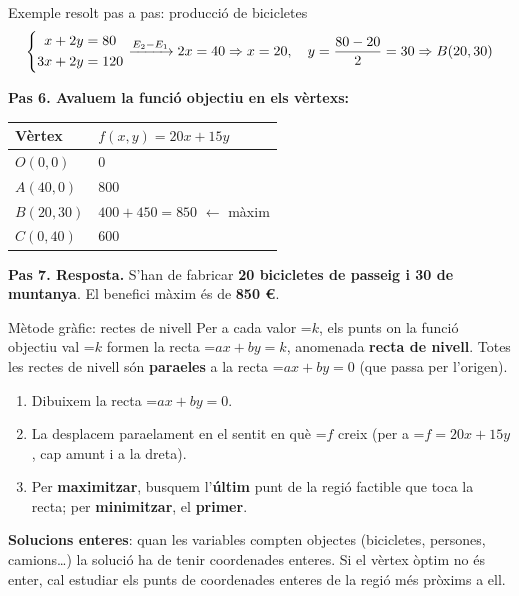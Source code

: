 \documentclass[11pt,a4paper]{article}
\newcommand{\fmm}[1]{\setbox0=\hbox{$#1$}\ifdim\wd0>\linewidth\fmdisp{#1}\else\mbox{\box0}\fi}
\newcommand{\fmdisp}[1]{\[\setbox2=\hbox{$\displaystyle #1$}\ifdim\wd2>\linewidth\resizebox{\linewidth}{!}{\box2}\else\box2\fi\]}
\newcommand{\fmuline}[1]{\textbf{\color{fmaccent}#1}}
\begin{document}
\begin{fmex}{Exemple resolt pas a pas: producció de bicicletes}
\fmdisp{\left\{\begin{aligned}x+2y&=80\\ 3x+2y&=120\end{aligned}\right.\xrightarrow{E_2-E_1}2x=40\Rightarrow x=20,\quad y=\frac{80-20}{2}=30\Rightarrow B(20,30)}

\textbf{Pas 6. Avaluem la funció objectiu en els vèrtexs:}

\begin{center}\renewcommand{\arraystretch}{1.5}\small\begin{tabularx}{\linewidth}{>{\raggedright\arraybackslash}p{3.2cm}>{\raggedright\arraybackslash}X}\toprule
\textbf{Vèrtex} & \textbf{$f(x,y)=20x+15y$}\\\midrule
$O(0,0)$ & $0$\\[3pt]
$A(40,0)$ & $800$\\[3pt]
\cellcolor{fmyellow!45}$B(20,30)$ & \cellcolor{fmyellow!45}$400+450=850$ $\leftarrow$ màxim\\[3pt]
$C(0,40)$ & $600$\\[3pt]
\bottomrule\end{tabularx}\end{center}

\textbf{Pas 7. Resposta.} S'han de fabricar \textbf{20 bicicletes de passeig i 30 de muntanya}. El benefici màxim és de \textbf{850 €}.
\end{fmex}

\begin{fmdef}{Mètode gràfic: rectes de nivell}
Per a cada valor \fmm{k}, els punts on la funció objectiu val \fmm{k} formen la recta \fmm{ax+by=k}, anomenada \textbf{recta de nivell}. Totes les rectes de nivell són \textbf{para\lgem{}eles} a la recta \fmm{ax+by=0} (que passa per l'origen).

\begin{enumerate}
\item Dibuixem la recta \fmm{ax+by=0}.
\item La desplacem para\lgem{}elament en el sentit en què \fmm{f} creix (per a \fmm{f=20x+15y}, cap amunt i a la dreta).
\item Per \textbf{maximitzar}, busquem l'\textbf{últim} punt de la regió factible que toca la recta; per \textbf{minimitzar}, el \textbf{primer}.
\end{enumerate}

\begin{fmnote}\fmuline{Solucions enteres}: quan les variables compten objectes (bicicletes, persones, camions\dots{}) la solució ha de tenir coordenades enteres. Si el vèrtex òptim no és enter, cal estudiar els punts de coordenades enteres de la regió més pròxims a ell.\end{fmnote}
\end{fmdef}
\end{document}
